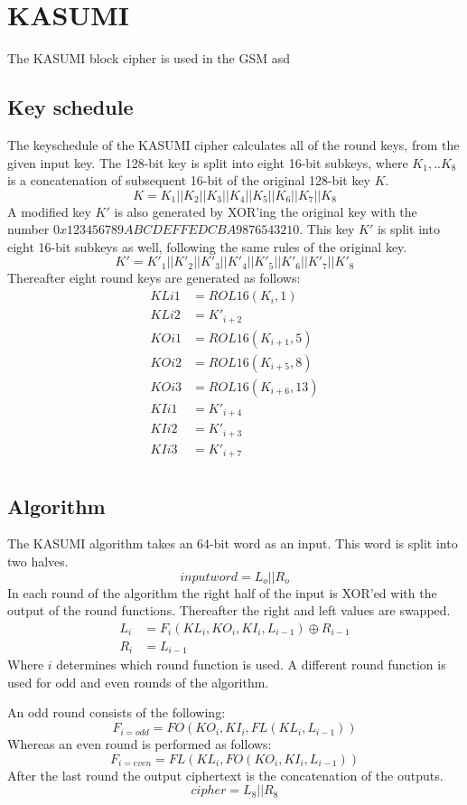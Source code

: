 \chapter{KASUMI}
\label{ch:kas}
The KASUMI block cipher is used in the GSM asd
\section{Key schedule}
The keyschedule of the KASUMI cipher calculates all of the round keys,
from the given input key. The 128-bit key is split into eight 16-bit
subkeys, where $K_1,..K_8$ is a concatenation of subsequent 16-bit of
the original 128-bit key $K$.
\[K = K_1 || K_2 || K_3 || K_4 || K_5 || K_6 || K_7 || K_8\]
A modified key $K'$ is also generated by XOR'ing the original key with
the number $0x123456789ABCDEFFEDCBA9876543210$. This key $K'$ is split
into eight 16-bit subkeys as well, following the same rules of the
original key.
\[K' = K'_1 || K'_2 || K'_3 || K'_4 || K'_5 || K'_6 || K'_7 || K'_8\]
Thereafter eight round keys are generated as follows:
\begin{align*}
  KLi1 &= ROL16(K_i,1)\\
  KLi2 &= K'_{i+2}\\
  KOi1 &= ROL16(K_{i + 1},5)\\
  KOi2 &= ROL16(K_{i + 5},8)\\
  KOi3 &= ROL16(K_{i + 6},13)\\
  KIi1 &= K'_{i+4}\\
  KIi2 &= K'_{i+3}\\
  KIi3 &= K'_{i+7}\\
\end{align*}

\section{Algorithm}
The KASUMI algorithm takes an 64-bit word as an input. This word is
split into two halves.
\[ inputword = L_o || R_o\]
In each round of the algorithm the right half of the input is XOR'ed
with the output of the round functions. Thereafter the right and left
values are swapped. 
\begin{align*}
  L_i &= F_i(KL_i,KO_i,KI_i,L_{i - 1}) \oplus R_{i - 1} \\
  R_i &= L_{i - 1}
\end{align*}
Where $i$ determines which round function is used. A different round
function is used for odd and even rounds of the algorithm.

An odd round consists of the following:
\[F_{i = odd} = FO(KO_i, KI_i, FL(KL_i, L_{i - 1})) \]
Whereas an even round is performed as follows: 
\[F_{i = even} = FL(KL_i, FO(KO_i,KI_i, L_{i - 1})) \]
After the last round the output ciphertext is the concatenation of the
outputs.
\[cipher = L_8 || R_8\]


